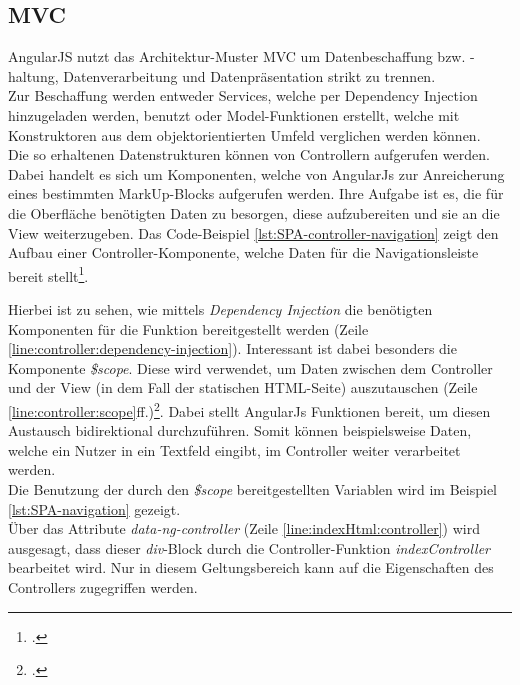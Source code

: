 \subsection{MVC}
\label{ssec:SPA-MVC}
AngularJS nutzt das Architektur-Muster \ac{MVC} um Datenbeschaffung bzw. -haltung, Datenverarbeitung und Datenpräsentation strikt zu trennen. \\ 
Zur Beschaffung werden entweder Services, welche per Dependency Injection hinzugeladen werden, benutzt oder Model-Funktionen erstellt, welche mit Konstruktoren aus dem objektorientierten Umfeld verglichen werden können. \\
Die so erhaltenen Datenstrukturen können von Controllern aufgerufen werden. Dabei handelt es sich um Komponenten, welche von AngularJs zur Anreicherung eines bestimmten MarkUp-Blocks aufgerufen werden. Ihre Aufgabe ist es, die für die Oberfläche benötigten Daten zu besorgen, diese aufzubereiten und sie an die View weiterzugeben. Das Code-Beispiel \ref{lst:SPA-controller-navigation} zeigt den Aufbau einer Controller-Komponente, welche Daten für die Navigationsleiste bereit stellt\footcite{online:angular:controller}.

Hierbei ist zu sehen, wie mittels \textit{Dependency Injection} die benötigten Komponenten für die Funktion bereitgestellt werden (Zeile \ref{line:controller:dependency-injection}). Interessant ist dabei besonders die Komponente \textit{\$scope}. Diese wird verwendet, um Daten zwischen dem Controller und der View (in dem Fall der statischen HTML-Seite) auszutauschen (Zeile \ref{line:controller:scope}ff.)\footcite{online:angular:scopes}. Dabei stellt AngularJs Funktionen bereit, um diesen Austausch bidirektional durchzuführen. Somit können beispielsweise Daten, welche ein Nutzer in ein Textfeld eingibt, im Controller weiter verarbeitet werden.\\
Die Benutzung der durch den \textit{\$scope} bereitgestellten Variablen wird im Beispiel \ref{lst:SPA-navigation} gezeigt.\\

Über das Attribute \textit{data-ng-controller} (Zeile \ref{line:indexHtml:controller}) wird ausgesagt, dass dieser \textit{div}-Block durch die Controller-Funktion \textit{indexController} bearbeitet wird. Nur in diesem Geltungsbereich kann auf die Eigenschaften des Controllers zugegriffen werden. \\
